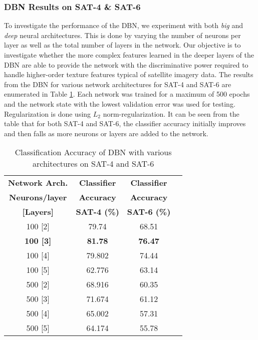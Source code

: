 \documentclass[11pt,a4paper]{article}
\begin{document}
\subsubsection{DBN Results on SAT-4 \& SAT-6}
To investigate the performance of the DBN, we experiment with both \emph{big} and \emph{deep} neural architectures. This is done by varying the number of neurons per layer as well as the total number of layers in the network. Our objective is to investigate whether the more complex features learned in the deeper layers of the DBN are able to provide the network with the discriminative power required to handle higher-order texture features typical of satellite imagery data. The results from the DBN for various network architectures for SAT-4 and SAT-6 are enumerated in Table \ref{table:DBN_accuracy_SAT_4_and_SAT_6}. Each network was trained for a maximum of 500 epochs and the network state with the lowest validation error was used for testing. Regularization is done using $L_2$ norm-regularization. It can be seen from the table that for both SAT-4 and SAT-6, the classifier accuracy initially improves and then falls as more neurons or layers are added to the network.

\begin{table}[h]
\centering
\begin{tabular}{ | c | c | c | c | }
    \hline
     \textbf{Network Arch.} & \textbf{Classifier} & \textbf{Classifier}\\ 
    \textbf{Neurons/layer} &   \textbf{Accuracy} & \textbf{Accuracy} \\ 
    \textbf{[Layers]} & \textbf{SAT-4 (\%)} & \textbf{SAT-6 (\%)} \\ \hline
    100 [2] & 79.74  & 68.51 \\ \hline
    \textbf{100 [3]} & \textbf{81.78}  & \textbf{76.47} \\ \hline
    100 [4] & 79.802  & 74.44 \\ \hline
    100 [5] & 62.776  & 63.14 \\ \hline
    500 [2] & 68.916 &  60.35 \\ \hline
    500 [3] &  71.674 &  61.12  \\ \hline
    500 [4] & 65.002  & 57.31 \\ \hline
    500 [5] & 64.174  & 55.78 \\ \hline
  \end{tabular}
  \caption{Classification Accuracy of DBN with various architectures on SAT-4 and SAT-6}
  \label{table:DBN_accuracy_SAT_4_and_SAT_6}
\end{table}
\end{document}
